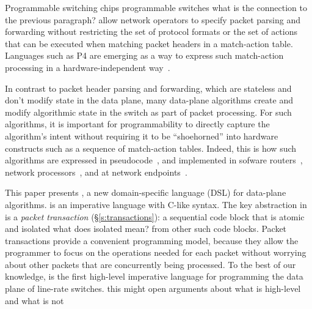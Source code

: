 Programmable switching chips \ac{programmable switches}
\ac{what is the connection to the previous paragraph?}
allow network operators to specify packet parsing and
forwarding without restricting the set of protocol formats or the set
of actions that can be executed when matching packet headers in a
match-action table. Languages such as P4 are emerging as a way to
express such match-action processing in a hardware-independent
way~\cite{p4,p4spec,dc_p4}.


In contrast to packet header parsing and forwarding, which are stateless
and don't modify state in the data plane, many data-plane algorithms
create and modify algorithmic state in the switch as part of packet
processing. For such algorithms, it is important for programmability to
directly capture the algorithm's intent without requiring it to be
``shoehorned'' into hardware constructs such as a sequence of
match-action tables. Indeed, this is how such algorithms are expressed
in pseudocode~\cite{red, csfq, codel_code, avq, blue}, and implemented
in sofware routers~\cite{click, dpdk, routebricks}, network
processors~\cite{packetc, nova}, and at network
endpoints~\cite{qdisc}.

This paper presents \pktlanguage, a new domain-specific language (DSL)
for data-plane algorithms.  \pktlanguage is an imperative language
with C-like syntax. The key abstraction in \pktlanguage is a {\em
  packet transaction} (\S\ref{s:transactions}): a sequential code
block that is atomic and isolated \ac{what does isolated mean?}
from other such code blocks. Packet
transactions provide a convenient programming model, because they
allow the programmer to focus on the operations needed for each packet
without worrying about other packets that are concurrently being
processed. To the best of our knowledge, \pktlanguage is the first
high-level imperative language for programming the data plane of
line-rate switches. \ac{this might open arguments about what is high-level
and what is not}

